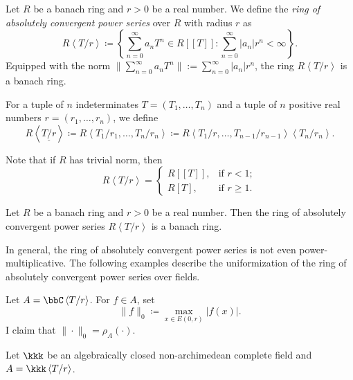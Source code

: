    \begin{definition}\label{def:ring_of_absolutely_convergent_power_series}
        Let \(R\) be a banach ring and \(r > 0\) be a real number.
        We define the \emph{ring of absolutely convergent power series} over \(R\) with radius \(r\) as
        \[ R\left<T/r\right> \coloneqq \left\{\sum_{n=0}^{\infty} a_n T^n \in R[[T]] : \sum_{n=0}^{\infty} |a_n| r^n < \infty \right\}. \]
        Equipped with the norm \(\|\sum_{n=0}^{\infty} a_n T^n\| := \sum_{n=0}^{\infty} |a_n| r^n\), the ring \(R\left<T/r\right>\) is a banach ring.

        For a tuple of \(n\) indeterminates \(T = (T_1, \ldots, T_n)\) and a tuple of \(n\) positive real numbers \(r = (r_1, \ldots, r_n)\), we define
        \[ R\left<\underline{T/r}\right> \coloneq R\left<T_1/r_1, \ldots, T_n/r_n\right> \coloneq R\left<T_1/r, \ldots, T_{n-1}/r_{n-1}\right>\left<T_n/r_n\right>. \]
    \end{definition}

    Note that if \(R\) has trivial norm, then
    \[ R\left<T/r\right> = \begin{cases}
        R[[T]], & \text{if } r < 1; \\
        R[T], & \text{if } r \geq 1.
    \end{cases} \]

    \begin{proposition}\label{prop:ring_of_absolutely_convergent_power_series_is_banach_ring}
        Let \(R\) be a banach ring and \(r > 0\) be a real number.
        Then the ring of absolutely convergent power series \(R\left<T/r\right>\) is a banach ring.
    \end{proposition}

    In general, the ring of absolutely convergent power series is not even power-multiplicative.
    The following examples describe the uniformization of the ring of absolutely convergent power series over fields.

    \begin{example}\label{eg:uniformation_of_ring_of_absolutely_convergent_power_series_over_C}
        Let \(A = \bbC\left<T/r\right>\).
        For \(f \in A\), set 
        \[ \|f\|_0 \coloneq \max_{x \in E(0,r)} |f(x)|. \]
        I claim that \(\|\cdot\|_0 = \rho_A(\cdot)\).
    \end{example}

    \begin{example}\label{eg:uniformation_of_ring_of_absolutely_convergent_power_series_over_NA_fields}
        Let \(\kkk\) be an algebraically closed non-archimedean complete field and \(A = \kkk\left<T/r\right>\).

    \end{example}


